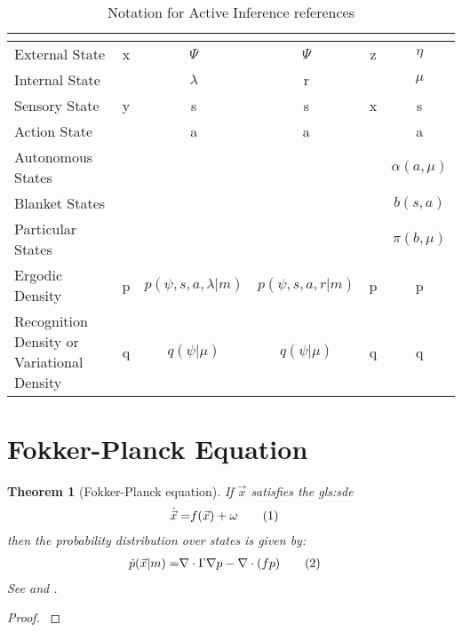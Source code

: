 \documentclass[]{article}
\newcommand\numberthis{\addtocounter{equation}{1}\tag{\theequation}}
\newtheorem{thm}{Theorem}
\begin{document}
\begin{table}[H]
	\begin{center}
		\caption{Notation for Active Inference references}
		\begin{tabular}{|l|c|c|c|c|c|}\hline
			&\cite{beal2003variational}&\cite{friston_life_2013}&\cite{friston2016therefore}&\cite{Blei2017}&\cite{friston2022free,Parr2022Active}\\ \hline
			External State&x&$\Psi$&$\Psi$&z&$\eta$\\ \hline
			Internal State&&$\lambda$&r&&$\mu$\\ \hline
			Sensory State&y&s&s&x&s\\ \hline
			Action State&&a&a&&a\\ \hline
			Autonomous States&&&&& $\alpha(a,\mu)$\\\hline
			Blanket States&&&&&$b(s,a)$\\ \hline
			Particular States&&&&&$\pi(b,\mu)$\\ \hline
			Ergodic Density&p&$p(\psi,s,a,\lambda\vert m)$&$p(\psi,s,a,r\vert m)$&p&p\\ \hline
			Recognition Density or Variational Density&q&$q(\psi\vert \mu)$&$q(\psi\vert \mu)$&q&q\\ \hline
		\end{tabular}
	\end{center}
\end{table}

\section{Fokker-Planck Equation}

\begin{thm}[Fokker-Planck equation]
	If $\vec{x}$ satisfies the \gls{gls:sde}
	\begin{align*}
		\dot{\vec{x}} =& f(\vec{x}) + \omega \numberthis \label{eq:dynamics}
	\end{align*}
	then the probability distribution over states is given by:
	\begin{align*}
		\dot{p}(\vec{x}\vert m) =& \nabla \cdot \Gamma \nabla p -\nabla \cdot(f p) \numberthis \label{eq:fokker:planck}
	\end{align*}
	See \cite[(2.2)]{friston_life_2013} and  \cite[Chapter 33]{cvitanovic2005chaos}.
\end{thm}

\begin{proof}
	\cite[Section 33.3]{cvitanovic2005chaos}
\end{proof}
\end{document}
